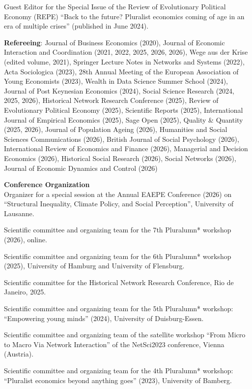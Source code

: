 \documentclass[margin]{res}
\begin{document}
\begin{resume}
	Guest Editor for the Special Issue of the Review of Evolutionary Political Economy (REPE) ``Back to the future? Pluralist economics coming of age in an era of multiple crises'' (published in June 2024).
	
	\textbf{Refereeing}:	Journal of Business Economics (2020), Journal of Economic Interaction and Coordination (2021, 2022, 2025, 2026, 2026), Wege aus der Krise (edited volume, 2021), Springer Lecture Notes in Networks and Systems (2022), Acta Sociologica (2023), 28th Annual Meeting of the European Association of Young Economists (2023), Wealth in Data Science Summer School (2024), Journal of Post Keynesian Economics (2024), Social Science Research (2024, 2025, 2026), Historical Network Research Conference (2025), Review of Evolutionary Political Economy (2025), Scientific Reports (2025), International Journal of Empirical Economics (2025), Sage Open (2025), Quality \& Quantity (2025, 2026), Journal of Population Ageing (2026), Humanities and Social Sciences Communications (2026), British Journal of Social Psychology (2026), International Review of Economics and Finance (2026), Managerial and Decision Economics (2026), Historical Social Research (2026), Social Networks (2026), Journal of Economic Dynamics and Control (2026)
	
	
	\textbf{Conference Organization}\\
	Organizer for a special session at the Annual EAEPE Conference (2026) on ``Structural Inequality, Climate Policy, and Social Perception'', University of Lausanne.
	
	Scientific committee and organizing team for the 7th Pluralumn* workshop (2026), online.
	
	Scientific committee and organizing team for the 6th Pluralumn* workshop (2025), University of Hamburg and University of Flensburg.
	
	Scientific committee for the Historical Network Research Conference, Rio de Janeiro, 2025.
	
	Scientific committee and organizing team for the 5th Pluralumn* workshop: ``Empowering young minds'' (2024), University of Duisburg-Essen.
	
	Scientific committee and organizing team of the satellite workshop ``From Micro to Macro Via Network Interaction'' of the NetSci2023 conference, Vienna (Austria).
	
	
	Scientific committee and organizing team for the 4th Pluralumn* workshop: ``Pluralist economics beyond anything goes'' (2023), University of Bamberg. 
	

\end{resume}
\end{document}
